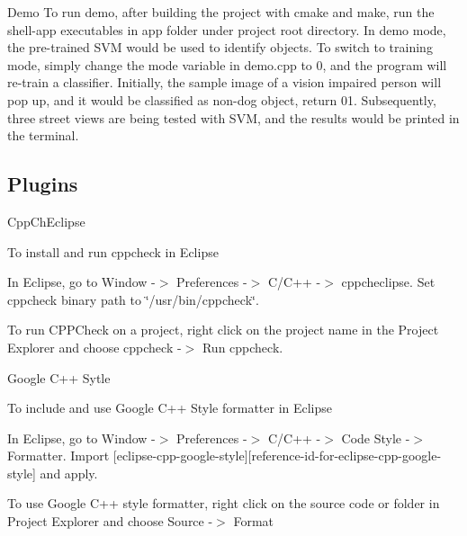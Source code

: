 \begin{DoxyItemize}
\item Demo To run demo, after building the project with cmake and make, run the shell-\/app executables in app folder under project root directory. In demo mode, the pre-\/trained S\+VM would be used to identify objects. To switch to training mode, simply change the mode variable in demo.\+cpp to 0, and the program will re-\/train a classifier. Initially, the sample image of a vision impaired person will pop up, and it would be classified as non-\/dog object, return 01. Subsequently, three street views are being tested with S\+VM, and the results would be printed in the terminal.
\end{DoxyItemize}

\subsection*{Plugins}


\begin{DoxyItemize}
\item Cpp\+Ch\+Eclipse

To install and run cppcheck in Eclipse
\begin{DoxyEnumerate}
\item In Eclipse, go to Window -\/$>$ Preferences -\/$>$ C/\+C++ -\/$>$ cppcheclipse. Set cppcheck binary path to \char`\"{}/usr/bin/cppcheck\char`\"{}.
\item To run C\+P\+P\+Check on a project, right click on the project name in the Project Explorer and choose cppcheck -\/$>$ Run cppcheck.
\end{DoxyEnumerate}
\item Google C++ Sytle

To include and use Google C++ Style formatter in Eclipse
\begin{DoxyEnumerate}
\item In Eclipse, go to Window -\/$>$ Preferences -\/$>$ C/\+C++ -\/$>$ Code Style -\/$>$ Formatter. Import \mbox{[}eclipse-\/cpp-\/google-\/style\mbox{]}\mbox{[}reference-\/id-\/for-\/eclipse-\/cpp-\/google-\/style\mbox{]} and apply.
\item To use Google C++ style formatter, right click on the source code or folder in Project Explorer and choose Source -\/$>$ Format 
\end{DoxyEnumerate}
\end{DoxyItemize}